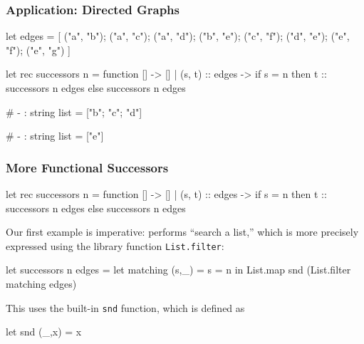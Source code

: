 \documentclass{plt}
\begin{document}
\begin{frame}[fragile]
  \frametitle{Application: Directed Graphs}

\begin{minipage}{0.6\textwidth}
\begin{ocaml}
let edges = [
  ("a", "b"); ("a", "c");
  ("a", "d"); ("b", "e");
  ("c", "f"); ("d", "e");
  ("e", "f"); ("e", "g") ]

let rec successors n = function
    []              -> []
  | (s, t) :: edges ->
      if s = n then
         t :: successors n edges
      else
         successors n edges
\end{ocaml}
\end{minipage}%
\begin{minipage}{0.4\textwidth}
  \graph
\end{minipage}

\begin{interactive}
# 
- : string list = ["b"; "c"; "d"]

# 
- : string list = ["e"]
\end{interactive}

\end{frame}

\begin{frame}[fragile]
  \frametitle{More Functional Successors}

\begin{ocaml}
let rec successors n = function
    []              -> []
  | (s, t) :: edges ->
      if s = n then
         t :: successors n edges
      else
         successors n edges
\end{ocaml}

\vspace{-5pt}
Our first example is imperative: performs ``search a list,'' which is more
precisely expressed using the library function \texttt{List.filter}:

\begin{ocaml}
let successors n edges = 
    let matching (s,_) = s = n in
    List.map snd (List.filter matching edges)
\end{ocaml}
\vspace{-5pt}

This uses the built-in \texttt{snd} function, which is defined as
\begin{ocaml}
let snd (_,x) = x
\end{ocaml}

\end{frame}
\end{document}

